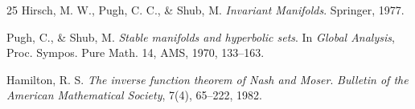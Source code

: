 \documentclass[11pt,a4paper]{article}
\theoremstyle{plain}
\theoremstyle{definition}
\theoremstyle{remark}
\numberwithin{equation}{section}
\numberwithin{figure}{section}
\begin{document}
\begin{thebibliography}{25}
 Hirsch, M. W., Pugh, C. C., \& Shub, M. \textit{Invariant Manifolds}. Springer, 1977.

 Pugh, C., \& Shub, M. \textit{Stable manifolds and hyperbolic sets}. In \textit{Global Analysis}, Proc. Sympos. Pure Math. 14, AMS, 1970, 133–163.

 Hamilton, R. S. \textit{The inverse function theorem of Nash and Moser}. \textit{Bulletin of the American Mathematical Society}, 7(4), 65–222, 1982.

\end{thebibliography}

\end{document}

